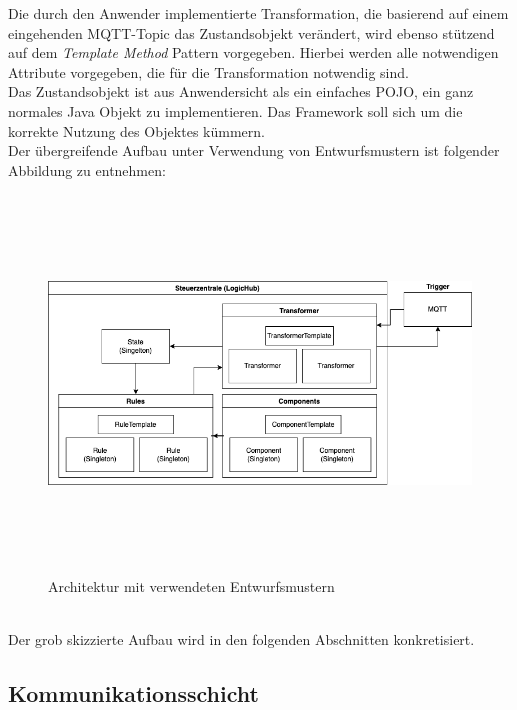         \linebreak
        Die durch den Anwender implementierte Transformation, die basierend auf einem eingehenden \acs{MQTT}-Topic das Zustandsobjekt verändert, wird  
        ebenso stützend auf dem \textit{Template Method} Pattern vorgegeben. Hierbei werden alle notwendigen Attribute vorgegeben, die für die Transformation notwendig sind.
        \\
        Das Zustandsobjekt ist aus Anwendersicht als ein einfaches \ac{POJO}, ein ganz normales Java Objekt zu implementieren. Das Framework soll sich um die korrekte Nutzung 
        des Objektes kümmern. 
        \\
        \linebreak
        Der übergreifende Aufbau unter Verwendung von Entwurfsmustern ist folgender Abbildung zu entnehmen:
        \begin{figure}[hbt!]
            \centering
            \includegraphics[width=14cm,height=10cm,keepaspectratio]{images/final_architecture_with_patterns.png}
            \caption{Architektur mit verwendeten Entwurfsmustern}
            \label{fig:patternarchitektur}
        \end{figure}
        \\
        Der grob skizzierte Aufbau wird in den folgenden Abschnitten konkretisiert.

    \subsection{Kommunikationsschicht}

